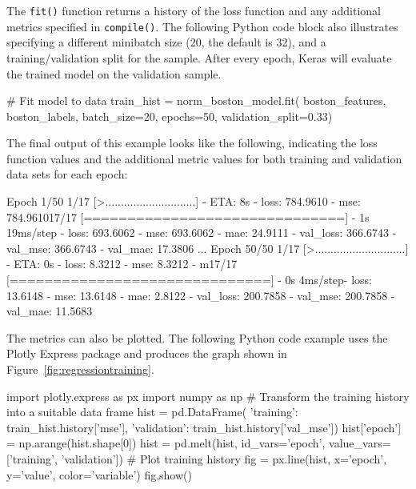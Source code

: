 \noindent The \texttt{fit()} function returns a history of the loss function and any additional metrics specified in \texttt{compile()}. The following Python code block also illustrates specifying a different minibatch size (20, the default is 32), and a training/validation split for the sample. After every epoch, Keras will evaluate the trained model on the validation sample. 

\begin{samepage}
\begin{pythoncode} 
# Fit model to data
train_hist = norm_boston_model.fit(
                    boston_features, 
                    boston_labels, 
                    batch_size=20,
                    epochs=50,
                    validation_split=0.33)
\end{pythoncode}
\end{samepage}

The final output of this example looks like the following, indicating the loss function values and the additional metric values for both training and validation data sets for each epoch:

\begin{samepage}
\begin{textcode}
Epoch 1/50
 1/17 [>.............................] - ETA: 8s - loss: 784.9610 - 
 mse: 784.961017/17 [==============================] - 1s 19ms/step - 
 loss: 693.6062 - mse: 693.6062 - mae: 24.9111 - val_loss: 366.6743 - 
 val_mse: 366.6743 - val_mae: 17.3806
...
Epoch 50/50
 1/17 [>.............................] - ETA: 0s - loss: 8.3212 - 
 mse: 8.3212 - m17/17 [==============================] - 0s 4ms/step- 
 loss: 13.6148 - mse: 13.6148 - mae: 2.8122 - val_loss: 200.7858 - 
 val_mse: 200.7858 - val_mae: 11.5683
\end{textcode}
\end{samepage}

The metrics can also be plotted. The following Python code example uses the Plotly Express package and produces the graph shown in Figure~\ref{fig:regressiontraining}.

\begin{samepage}
\begin{pythoncode}
import plotly.express as px
import numpy as np
# Transform the training history into a suitable data frame
hist = pd.DataFrame({
    'training':   train_hist.history['mse'],
    'validation': train_hist.history['val_mse']})
hist['epoch'] = np.arange(hist.shape[0])
hist = pd.melt(hist, id_vars='epoch', 
                     value_vars=['training', 'validation'])
# Plot training history
fig = px.line(hist, x='epoch', y='value', color='variable')
fig.show()
\end{pythoncode}
\end{samepage}


